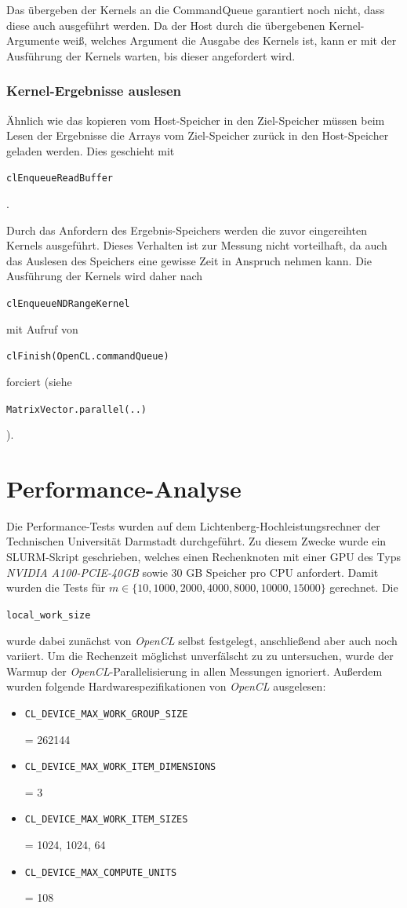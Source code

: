 \documentclass[
	ngerman,
	ruledheaders=section,
	class=report,
	thesis={type=Dokumentation},
	ignore-missing-data=true,
	accentcolor=9c,
	custommargins=false,
	marginpar=false,
	parskip=half-,
	fontsize=11pt,
]{tudapub}
\let\code\texttt
\def\code#1{\begin{small}\texttt{#1}\end{small}}
\begin{document}
Das übergeben der Kernels an die CommandQueue garantiert noch nicht, dass diese auch ausgeführt werden. Da der Host durch die übergebenen Kernel-Argumente weiß, welches Argument die Ausgabe des Kernels ist, kann er mit der Ausführung der Kernels warten, bis dieser angefordert wird.

\subsection{Kernel-Ergebnisse auslesen}
Ähnlich wie das kopieren vom Host-Speicher in den Ziel-Speicher müssen beim Lesen der Ergebnisse die Arrays vom Ziel-Speicher zurück in den Host-Speicher geladen werden. Dies geschieht mit \code{clEnqueueReadBuffer}.

Durch das Anfordern des Ergebnis-Speichers werden die zuvor eingereihten Kernels ausgeführt. Dieses Verhalten ist zur Messung nicht vorteilhaft, da auch das Auslesen des Speichers eine gewisse Zeit in Anspruch nehmen kann. Die Ausführung der Kernels wird daher nach \code{clEnqueueNDRangeKernel} mit Aufruf von \code{clFinish(OpenCL.commandQueue)} forciert (siehe \code{MatrixVector.parallel(..)}).

\chapter{Performance-Analyse}
Die Performance-Tests wurden auf dem Lichtenberg-Hochleistungsrechner der Technischen Universität Darmstadt durchgeführt. Zu diesem Zwecke wurde ein SLURM-Skript geschrieben, welches einen Rechenknoten mit einer GPU des Typs \textit{NVIDIA A100-PCIE-40GB} sowie 30 GB Speicher pro CPU anfordert. Damit wurden die Tests für $m \in \{10, 1000, 2000, 4000, 8000, 10000, 15000\}$ gerechnet. Die \code{local\_work\_size} wurde dabei zunächst von \textit{OpenCL} selbst festgelegt, anschließend aber auch noch variiert. Um die Rechenzeit möglichst unverfälscht zu zu untersuchen, wurde der Warmup der \textit{OpenCL}-Parallelisierung in allen Messungen ignoriert. Außerdem wurden folgende Hardwarespezifikationen von \textit{OpenCL} ausgelesen:
\begin{itemize}
	\item \code{CL\_DEVICE\_MAX\_WORK\_GROUP\_SIZE} = 262144
	\item \code{CL\_DEVICE\_MAX\_WORK\_ITEM\_DIMENSIONS} = 3
	\item \code{CL\_DEVICE\_MAX\_WORK\_ITEM\_SIZES} = 1024, 1024, 64
	\item \code{CL\_DEVICE\_MAX\_COMPUTE\_UNITS} = 108
\end{itemize}
\end{document}
